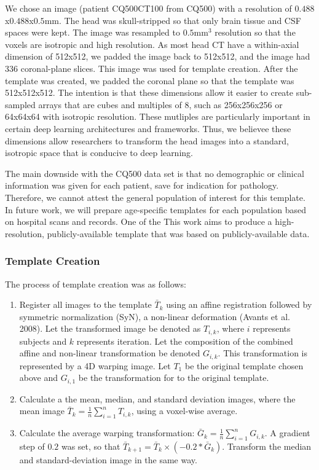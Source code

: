 \documentclass[]{elsarticle} %
\providecommand{\tightlist}{%
  \setlength{\itemsep}{0pt}\setlength{\parskip}{0pt}}
\begin{document}
We chose an image (patient CQ500CT100 from CQ500) with a resolution of \(0.488\)x\(0.488\)x\(0.5\)mm. The head was skull-stripped so that only brain tissue and CSF spaces were kept. The image was resampled to \(0.5\)mm\(^3\) resolution so that the voxels are isotropic and high resolution. As most head CT have a within-axial dimension of 512x512, we padded the image back to 512x512, and the image had 336 coronal-plane slices. This image was used for template creation. After the template was created, we padded the coronal plane so that the template was 512x512x512. The intention is that these dimensions allow it easier to create sub-sampled arrays that are cubes and multiples of 8, such as 256x256x256 or 64x64x64 with isotropic resolution. These mutliples are particularly important in certain deep learning architectures and frameworks. Thus, we believee these dimensions allow researchers to transform the head images into a standard, isotropic space that is conducive to deep learning.

The main downside with the CQ500 data set is that no demographic or clinical information was given for each patient, save for indication for pathology. Therefore, we cannot attest the general population of interest for this template. In future work, we will prepare age-specific templates for each population based on hospital scans and records. One of the
This work aims to produce a high-resolution, publicly-available template that was based on publicly-available data.

\hypertarget{template-creation}{%
\subsubsection{Template Creation}\label{template-creation}}

The process of template creation was as follows:

\begin{enumerate}
\def\labelenumi{\arabic{enumi}.}
\tightlist
\item
  Register all images to the template \(\bar{T}_{k}\) using an affine registration followed by symmetric normalization (SyN), a non-linear deformation (Avants et al. 2008). Let the transformed image be denoted as \(T_{i, k}\), where \(i\) represents subjects and \(k\) represents iteration. Let the composition of the combined affine and non-linear transformation be denoted \(G_{i, k}\). This transformation is represented by a 4D warping image. Let \(T_{1}\) be the original template chosen above and \(G_{i, 1}\) be the transformation for to the original template.
\item
  Calculate a the mean, median, and standard deviation images, where the mean image \(\bar{T}_{k} = \frac{1}{n} \sum\limits_{i = 1}^n T_{i, k}\), using a voxel-wise average.\\
\item
  Calculate the average warping transformation: \(\bar{G}_{k} = \frac{1}{n} \sum\limits_{i = 1}^n G_{i, k}\). A gradient step of \(0.2\) was set, so that
  \(\bar{T}_{k + 1} = \bar{T}_{k} \times \left(-0.2 * \bar{G}_{k}\right)\). Transform the median and standard-deviation image in the same way.
\end{enumerate}
\end{document}
